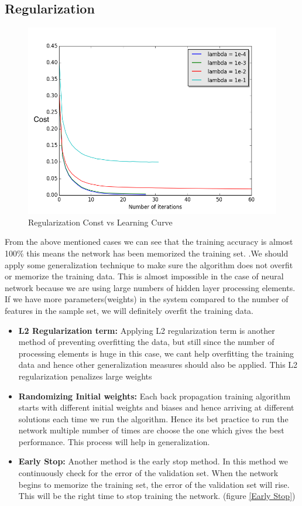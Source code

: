 \documentclass[conference]{IEEEtran}
\begin{document}
\subsection{Regularization}
\begin{figure}[h!]
\centering
\includegraphics[scale=0.45]{regularizationVSlearningCurve.png}
\caption{Regularization Const vs Learning Curve }
\label{regularization graph}
\end{figure}


From the above mentioned cases we can see that the training accuracy is almost 100\% this means the network has been memorized the training set. .We should apply some generalization technique to make sure the algorithm does not overfit or memorize the training data. This is almost impossible in the case of neural network because we are using large numbers of hidden layer processing elements. If we have more parameters(weights) in the system compared to the number of features in the sample set, we will definitely overfit the training data. 
\begin{itemize}
\item \textbf{L2 Regularization term:} Applying L2 regularization term is another method of preventing overfitting the data, but still since the number of processing elements is huge in this case, we cant help overfitting the training data and hence other generalization measures should also be applied. This L2 regularization penalizes large weights 
\item \textbf{Randomizing Initial weights:} Each back propagation training algorithm starts with different initial weights and biases and hence arriving at different solutions each time we run the algorithm. Hence its bet practice to run the network multiple number of times are choose the one which gives the best performance. This process will help in generalization. 
\item \textbf{Early Stop:} Another method is the early stop method. In this method we continuously check for the error of the validation set. When the network begins to memorize the training set, the error of the validation set will rise. This will be the right time to stop training the network. (figure \ref{Early Stop})
\end{itemize}
\end{document}
